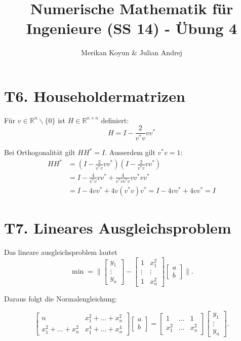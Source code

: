 \documentclass[11pt]{article}
\theoremstyle{plain}
\theoremstyle{definition}
\renewcommand{\a}{\"{a}}
\renewcommand{\u}{\"{u}}
\begin{document}
\title{Numerische Mathematik f\u r Ingenieure (SS 14) - \"{U}bung 4}
\author{Merikan Koyun \& Julian Andrej}
\maketitle

\section*{T6. Householdermatrizen}
F\u r $v \in \mathbb{R}^n \backslash \{0\}$ ist $H \in \mathbb{R}^{n\times n}$ definiert:
\begin{equation}
H = I - \frac{2}{v^*v} vv^*
\end{equation}

Bei Orthogonalit\a t gilt $HH^*=I$. Ausserdem gilt $v^*v=1$:
\begin{align}
HH^* &= (I-\frac{2}{v^*v}vv^*)(I-\frac{2}{v^*v}vv^*) \\
&=  I - \frac{4}{v^*v}vv^* + \frac{4}{v^*v v^*v} vv^*vv^* \\
&= I - 4vv^* + 4v(v^*v)v^* = I-4vv^* + 4vv^* = I
\end{align}

\section*{T7. Lineares Ausgleichsproblem}

Das lineare ausgleichsproblem lautet
\begin{equation}
\min = \| \begin{bmatrix} y_1 \\ \vdots \\ y_n \end{bmatrix} -  \begin{bmatrix} 1 & x_1^2 \\ \vdots & \vdots \\ 1 & x_n^2  \end{bmatrix} \begin{bmatrix} a \\ b \end{bmatrix} \|.
\end{equation}

Daraus folgt die Normalengleichung:

\begin{equation}
\begin{bmatrix} n & x_1^2 + \dots + x_n^2 \\
  x_1^2 + \dots + x_n^2 & x_1^4 + \dots + x_n^4
\end{bmatrix} \begin{bmatrix} a \\ b \end{bmatrix}
= \begin{bmatrix} 1 & \dots & 1 \\ x_1^2 & \dots & x_n^2 \end{bmatrix} \begin{bmatrix} y_1 \\ \vdots \\ y_n \end{bmatrix}.
\end{equation}
\end{document}
